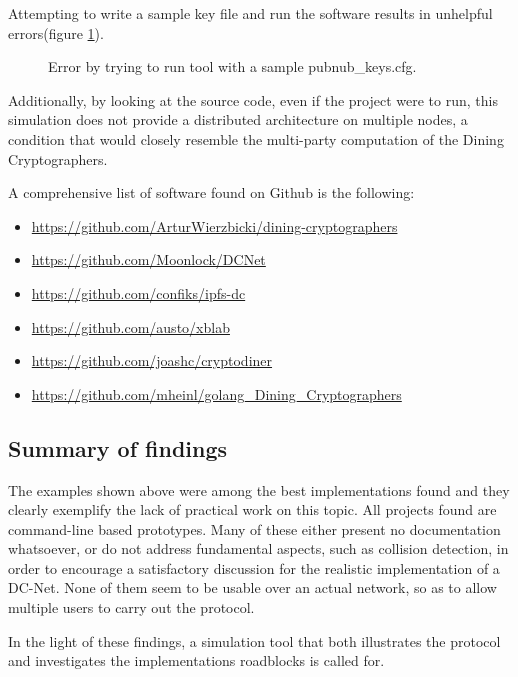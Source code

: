 Attempting to write a sample key file and run the software results in unhelpful errors(figure \ref{fig:work2error}). 
 
\begin{figure}[H]
    \centering
    \caption{Error by trying to run tool with a sample pubnub{\_}keys.cfg.}
    \label{fig:work2error}
\end{figure}

Additionally, by looking at the source code, even if the project were to run, this simulation does not provide a distributed architecture on multiple nodes, a condition that would closely resemble the multi-party computation of the Dining Cryptographers. \newline


A comprehensive list of software found on Github is the following: 
\begin{itemize}
    \item \url{https://github.com/ArturWierzbicki/dining-cryptographers}
    \item \url{https://github.com/Moonlock/DCNet}
    \item \url{https://github.com/confiks/ipfs-dc}
    \item \url{https://github.com/austo/xblab}
    \item \url{https://github.com/joashc/cryptodiner}
    \item \url{https://github.com/mheinl/golang_Dining_Cryptographers}
\end{itemize}


\subsection{Summary of findings}
The examples shown above were among the best implementations found and they clearly exemplify the lack of practical work on this topic. All projects found are command-line based prototypes. Many of these either present no documentation whatsoever, or do not address fundamental aspects, such as collision detection, in order to encourage a satisfactory discussion for the realistic implementation of a DC-Net. None of them seem to be usable over an actual network, so as to allow multiple users to carry out the protocol.

In the light of these findings, a simulation tool that both illustrates the protocol and investigates the implementations roadblocks is called for.

